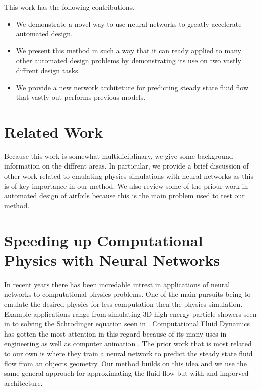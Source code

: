 \documentclass{article} %
\begin{document}
This work has the following contributions.
\begin{itemize}
  \item We demonstrate a novel way to use neural networks to greatly accelerate automated design.
  \item We present this method in such a way that it can ready applied to many other automated design problems by demonstrating its use on two vastly diffrent design tasks.
  \item We provide a new network architeture for predicting steady state fluid flow that vastly out performs previous models.
\end{itemize}

\section{Related Work}

Because this work is somewhat multidiciplinary, we give some background information on the diffrent areas. In particular, we provide a brief discussion of other work related to emulating physics simulations with neural networks as this is of key importance in our method. We also review some of the priour work in automated design of airfoils because this is the main problem used to test our method.

\section{Speeding up Computational Physics with Neural Networks}

In recent years there has been incredable intrest in applications of neural networks to computational physics problems. One of the main pursuits being to emulate the desired physics for less computation then the physics simulation. Example applications range from simulating 3D high energy particle showers seen in \citep{2017arXiv170502355P} to solving the Schrodinger equation seen in \citep{mills2017deep}. Computational Fluid Dynamics has gotten the most attention in this regard because of its many uses in engineering as well as computer animation \cite{tompson2016accelerating} \cite{2017arXiv170509036H}. The prior work that is most related to our own is \citep{guo2016convolutional} where they train a neural network to predict the steady state fluid flow from an objects geometry. Our method builds on this idea and we use the same general approach for approximating the fluid flow but with and imporved architecture.
\end{document}
